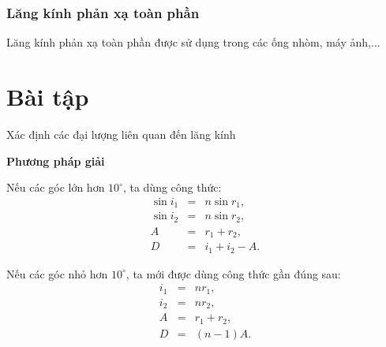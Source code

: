 \subsubsection{Lăng kính phản xạ toàn phần}
Lăng kính phản xạ toàn phần được sử dụng trong các ống nhòm, máy ảnh,...

\section{Bài tập}
\begin{dang}{Xác định các đại lượng liên quan đến lăng kính}
\end{dang}
\textbf{Phương pháp giải}

	
	Nếu các góc lớn hơn $10^\circ$, ta dùng công thức: 
	\begin{eqnarray*}
		\sin i_1&=&n\sin r_1,\\
		\sin i_2&=&n\sin r_2,\\
		A&=&r_1+r_2,\\
		D&=&i_1+i_2-A.
	\end{eqnarray*}	
	
	Nếu các góc nhỏ hơn $10^\circ$, ta mới được dùng công thức gần đúng sau: 
	\begin{eqnarray*}
	i_1&=&n r_1,\\
	i_2&=&n r_2,\\
	A&=&r_1+r_2,\\
	D&=&(n-1)A.
	\end{eqnarray*}	
	
	



